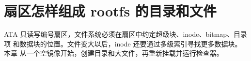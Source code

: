 \chapter{扇区怎样组成 rootfs 的目录和文件}

ATA 只读写编号扇区，文件系统必须在扇区中约定超级块、inode、bitmap、目录项
和数据块的位置。文件变大以后，inode 还要通过多级索引寻找更多数据块。本章
从一个空镜像开始，创建目录和大文件，再重新挂载并运行检查器。





